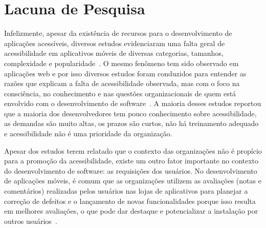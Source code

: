 


\section{Lacuna de Pesquisa}

Infelizmente, 
apesar da existência de recursos para o desenvolvimento de aplicações acessíveis, 
diversos estudos evidenciaram uma falta geral de acessibilidade em aplicativos móveis de diversas categorias, tamanhos, complexidade e popularidade~\cite{serra2015accessibility,eler2018mate,Yan2019currentstatus,Vendome2019,Alshayban2020,AcostaVargas2020}.
O mesmo fenômeno tem sido observado em aplicações web e por isso diversos estudos foram conduzidos para entender as razões que explicam a falta de acessibilidade observada, mas com o foco na consciência, no conhecimento e nas questões organizacionais de quem está envolvido com o desenvolvimento de software~\cite{  
lazar2004improving,Freire2008survey,oliveira2017strategies,Inal2019,barzilai2008factors,Putnam:2012}. 
A maioria desses estudos reportou que a maioria dos desenvolvedores tem pouco conhecimento sobre acessibilidade, as demandas são muito altas, os prazos são curtos, não há treinamento adequado e acessibilidade não é uma prioridade da organização.

Apesar dos estudos terem relatado que o contexto das organizações não é propício para a promoção da acessibilidade, existe um outro fator importante no contexto do desenvolvimento de software: as requisições dos usuários. 
No desenvolvimento de aplicações móveis, 
é comum que as organizações utilizem as avaliações (notas e comentários) realizadas pelos usuários nas lojas de aplicativos para planejar a correção de defeitos e o lançamento de novas funcionalidades porque isso resulta em melhores avaliações, o que pode dar destaque e potencializar a instalação por outros usuários~\cite{Nayebi2016,Palomba2015userreviews,Palomba2018crowdsourcing,Li2018MobileAE,Ciurumelea2017analyzing,Ortega2015thesis}.

